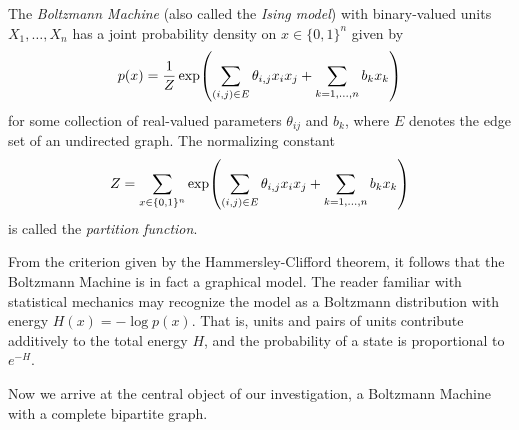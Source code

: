 \documentclass[11pt,titlepage]{article}
\numberwithin{equation}{section}
\begin{document}
    \begin{definition}
        The \emph{Boltzmann Machine} (also called the \emph{Ising model}) with
        binary-valued units $X_1, \ldots, X_n$ has a joint probability density
        on $x \in \{0,1\}^n$ given by
        \[
            p(x)
            = \frac 1 Z \exp\pdil*{\sum_{(i,j) \in E} \theta_{i,j} x_i x_j +
            \sum_{k=1,\ldots,n} b_k x_k}
        \]
        for some collection of real-valued parameters $\theta_{ij}$ and $b_k$,
        where $E$ denotes the edge set of an undirected graph.  The normalizing
        constant
        \[
            Z = \sum_{x \in \{0,1\}^n} 
            \exp\pdil*{\sum_{(i,j) \in E} \theta_{i,j} x_i x_j +
                        \sum_{k=1,\ldots,n} b_k x_k}
        \]
        is called the \emph{partition function}.
    \end{definition}

    From the criterion given by the Hammersley-Clifford theorem, it follows that
    the Boltzmann Machine is in fact a graphical model.  The reader familiar
    with statistical mechanics may recognize the model as a Boltzmann
    distribution with energy $H(x) = -\log p(x)$.  That is, units and pairs of
    units contribute additively to the total energy $H$, and the probability of
    a state is proportional to $e^{-H}$.
    
    Now we arrive at the central object of our investigation, a Boltzmann
    Machine with a complete bipartite graph.
\end{document}
